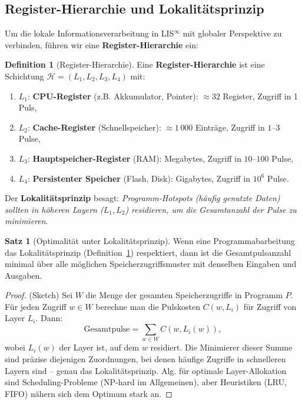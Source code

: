 \documentclass[a4paper,12pt]{article}
\theoremstyle{definition}
\newtheorem{definition}{Definition}
\newtheorem{satz}{Satz}
\begin{document}
\subsection{Register-Hierarchie und Lokalitätsprinzip}

Um die lokale Informationsverarbeitung in LIS$^{\infty}$ mit globaler Perspektive zu verbinden, führen wir eine \textbf{Register-Hierarchie} ein:

\begin{definition}[Register-Hierarchie]
	\label{def:reg_hierarchie}
	Eine \textbf{Register-Hierarchie} ist eine Schichtung $\mathcal{H} = (L_1, L_2, L_3, L_4)$ mit:
	\begin{enumerate}
		\item $L_1$: \textbf{CPU-Register} (z.B. Akkumulator, Pointer): $\approx 32$ Register, Zugriff in 1 Puls,
		\item $L_2$: \textbf{Cache-Register} (Schnellspeicher): $\approx 1\,000$ Einträge, Zugriff in $1\text{--}3$ Pulse,
		\item $L_3$: \textbf{Hauptspeicher-Register} (RAM): Megabytes, Zugriff in $10\text{--}100$ Pulse,
		\item $L_4$: \textbf{Persistenter Speicher} (Flash, Disk): Gigabytes, Zugriff in $10^6$ Pulse.
	\end{enumerate}
	
	Der \textbf{Lokalitätsprinzip} besagt: \textit{Programm-Hotspots (häufig genutzte Daten) sollten in höheren Layern ($L_1, L_2$) residieren, um die Gesamtanzahl der Pulse zu minimieren}.
\end{definition}

\begin{satz}[Optimalität unter Lokalitätsprinzip]
	\label{satz:lokalitaet_optimal}
	Wenn eine Programmabarbeitung das Lokalitätsprinzip (Definition~\ref{def:reg_hierarchie}) respektiert, dann ist die Gesamtpulsanzahl minimal über alle möglichen Speicherzugriffsmuster mit denselben Eingaben und Ausgaben.
\end{satz}

\begin{proof}
	(Sketch) Sei $W$ die Menge der gesamten Speicherzugriffe in Programm $P$. Für jeden Zugriff $w \in W$ berechne man die Pulskosten $C(w, L_i)$ für Zugriff von Layer $L_i$. Dann:
	\[
	\text{Gesamtpulse} = \sum_{w \in W} C(w, L_i(w)),
	\]
	wobei $L_i(w)$ der Layer ist, auf dem $w$ residiert. Die Minimierer dieser Summe sind präzise diejenigen Zuordnungen, bei denen häufige Zugriffe in schnelleren Layern sind -- genau das Lokalitätsprinzip. Alg. für optimale Layer-Allokation sind Scheduling-Probleme (NP-hard im Allgemeinen), aber Heuristiken (LRU, FIFO) nähern sich dem Optimum stark an.
\end{proof}
\end{document}
